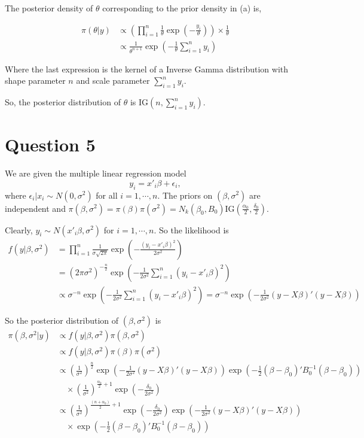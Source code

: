 \documentclass[a4paper]{article}
\begin{document}
The posterior density of \(\theta\) corresponding to the prior density in (a) is,

\begin{align*}
    \pi(\theta|y) &\propto \left(\prod_{i=1}^{n}\frac{1}{\theta}\exp\left(-\frac{y_i}{\theta}\right)\right) \times \frac{1}{\theta}\\
    &\propto \frac{1}{\theta^{n+1}}\exp\left(-\frac{1}{\theta}\sum_{i=1}^{n}y_i\right)
\end{align*}

Where the last expression is the kernel of a Inverse Gamma distribution with shape parameter \(n\) and scale parameter \(\sum_{i=1}^{n}y_i\).

So, the posterior distribution of \(\theta\) is \(\text{IG}(n,\sum_{i=1}^{n}y_i)\).

\newpage

\section*{Question 5}
We are given the multiple linear regression model
\[y_i = x'_i\beta + \epsilon_i,\] 
where \(\epsilon_i|x_i\sim N(0,\sigma^2)\) for all \(i=1,\cdots,n\). The priors on \((\beta,\sigma^2)\) are independent and \(\pi(\beta, \sigma^2) = \pi(\beta)\pi(\sigma^2) = N_k(\beta_0,B_0)\text{IG}(\frac{\alpha_0}{2},\frac{\delta_0}{2})\).

\vspace{0.25cm}

Clearly, \(y_i \sim N(x'_i\beta, \sigma^2)\) for \(i = 1, \cdots, n\). So the likelihood is 
\begin{align*}
    f(y|\beta,\sigma^2) &= \prod_{i=1}^{n} \frac{1}{\sigma\sqrt{2\pi}}\exp\left(-\frac{(y_i - x'_i\beta)^2}{2\sigma^2}\right)\\
    &= (2\pi\sigma^2)^{-\frac{n}{2}}\exp\left(-\frac{1}{2\sigma^2}\sum_{i=1}^{n}(y_i - x'_i\beta)^2\right)\\
    &\propto \sigma^{-n}\exp\left(-\frac{1}{2\sigma^2}\sum_{i=1}^{n}(y_i - x'_i\beta)^2\right) = \sigma^{-n}\exp\left(-\frac{1}{2\sigma^2}(y - X\beta)'(y-X\beta)\right)
\end{align*}

So the posterior distribution of \((\beta,\sigma^2)\) is
\begin{align*}
    \pi(\beta,\sigma^2|y) &\propto f(y|\beta,\sigma^2)\pi(\beta,\sigma^2)\\
    &\propto f(y|\beta,\sigma^2)\pi(\beta)\pi(\sigma^2)\\
    &\propto \left(\frac{1}{\sigma^2}\right)^{\frac{n}{2}}\exp\left(-\frac{1}{2\sigma^2}(y - X\beta)'(y-X\beta)\right) \exp\left(-\frac{1}{2}(\beta - \beta_0)'B_0^{-1}(\beta - \beta_0)\right) \\
    &\quad \times \left(\frac{1}{\sigma^2}\right)^{\frac{\alpha_0}{2} + 1}\exp\left(-\frac{\delta_0}{2\sigma^2}\right)\\
    &\propto \left(\frac{1}{\sigma^2}\right)^{\frac{(n+\alpha_0)}{2}+1}\exp\left(-\frac{\delta_0}{2\sigma^2}\right)\exp\left(-\frac{1}{2\sigma^2}(y - X\beta)'(y-X\beta)\right) \\
    & \quad \times \exp\left(-\frac{1}{2}(\beta - \beta_0)'B_0^{-1}(\beta - \beta_0)\right)
\end{align*}
\end{document}
